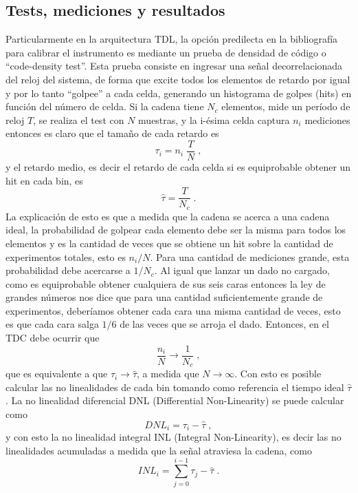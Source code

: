 \subsection{Tests, mediciones y resultados}
Particularmente en la arquitectura TDL, la opción predilecta en la bibliografía para calibrar el instrumento es mediante 
un prueba de densidad de código o ``code-density test''. Esta prueba consiste en ingresar una señal decorrelacionada del reloj del sistema, de forma que 
excite todos los elementos de retardo por igual y por lo tanto ``golpee'' a cada celda, generando un
histograma de golpes (hits) en función del número de celda. Si la cadena tiene
$N_c$ elementos, mide un período de reloj $T$, se realiza el test con $N$ muestras,
y la i-ésima celda captura $n_i$ mediciones entonces es claro que el 
tamaño de cada retardo es
\begin{equation}
     \tau_i = n_i \; \dfrac{T}{N} \; ,
     \label{eq: tau_i}
\end{equation}
y el retardo medio, es decir el retardo de cada celda si es equiprobable obtener un hit 
en cada bin, es
\begin{equation}
     \hat{\tau} = \dfrac{T}{N_c} \; .
     \label{eq: tau_medio}
\end{equation}
La explicación de esto es que a medida que la cadena se acerca a una cadena ideal, la probabilidad de golpear cada
elemento debe ser la misma para todos los elementos y es la cantidad de veces que se obtiene un hit
sobre la cantidad de experimentos totales, esto es $n_i/N$. Para una cantidad de mediciones grande,
esta probabilidad debe acercarse a $1/N_c$. Al igual que lanzar un dado no cargado, como es
equiprobable obtener cualquiera de sus seis caras entonces la ley de grandes números nos dice
que para una cantidad suficientemente grande de experimentos, deberíamos obtener cada cara una misma cantidad
de veces, esto es que cada cara salga $1/6$ de las veces que se arroja el dado.
Entonces, en el TDC debe ocurrir que 
\begin{equation*}
     \dfrac{n_i}{N} \longrightarrow \dfrac{1}{N_c} \; ,
\end{equation*}
que es equivalente a que $\tau_i \longrightarrow \hat{\tau}$, a medida que $N \rightarrow \infty$.
Con esto es posible calcular las no linealidades de cada bin tomando como referencia
el tiempo ideal $\hat{\tau}$. La no linealidad diferencial DNL (Differential Non-Linearity) 
se puede calcular como
\begin{equation}
     DNL_i = \tau_i - \hat{\tau} \; ,
     \label{eq: DNL}
\end{equation}
y con esto la no linealidad integral INL (Integral Non-Linearity), es decir las no linealidades acumuladas a medida que la 
señal atraviesa la cadena, como
\begin{equation}
     INL_i = \sum_{j=0}^{i-1} {\tau_j - \hat{\tau}} \; .
     \label{eq: INL}
\end{equation}


